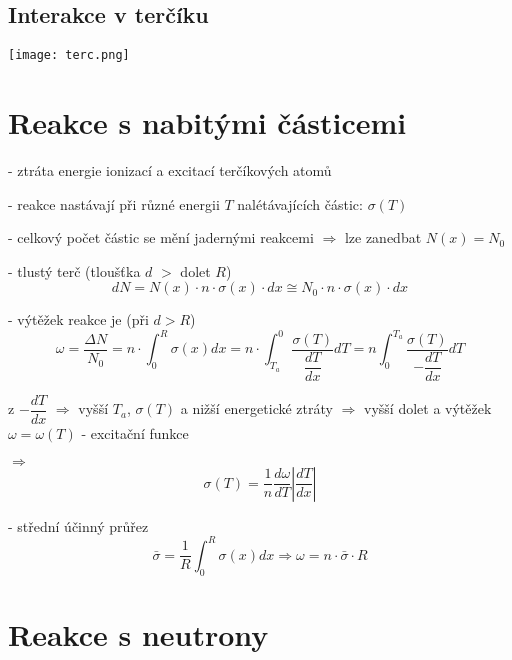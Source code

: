 \documentclass[../../main.tex]{subfiles}
\begin{document}
\subsection{Interakce v terčíku}

\begin{center}
	\texttt{[image: terc.png]}
\end{center}
	
\section{Reakce s nabitými částicemi}

- ztráta energie ionizací a excitací terčíkových atomů

- reakce nastávají při různé energii $T$ nalétávajících částic: $\sigma(T)$

- celkový počet částic se mění jadernými reakcemi $\Rightarrow$ lze zanedbat $N(x) = N_0$

- tlustý terč (tloušťka $d$ $>$ dolet $R$)
\begin{equation}
dN = N(x) \cdotp n \cdotp \sigma(x) \cdotp dx \cong N_0 \cdotp n \cdotp \sigma(x) \cdotp dx
\end{equation}

- výtěžek reakce je (při $d > R$)
\begin{equation}
\omega = \dfrac{\Delta N}{N_0 } = n \cdotp \int_{0}^{R} \sigma(x) dx = n \cdotp \int_{T_a}^{0} \dfrac{\sigma(T)}{\dfrac{dT}{dx}} dT = n \int_{0}^{T_a} \dfrac{\sigma(T)}{- \dfrac{dT}{dx}} dT
\end{equation}

z $-\dfrac{dT}{dx}$ $\Rightarrow$ vyšší $T_a$, $\sigma(T)$ a nižší energetické ztráty $\Rightarrow$ vyšší dolet a výtěžek $\omega = \omega (T)$ - excitační funkce

$\Rightarrow$ 
\begin{equation}
\sigma(T) = \dfrac{1}{n} \dfrac{d \omega}{dT} \left| \dfrac{dT}{dx} \right| 
\end{equation}

- střední účinný průřez 
\begin{equation}
\bar{\sigma} = \dfrac{1}{R} \int_{0}^{R} \sigma(x) dx \Rightarrow \omega = n \cdotp \bar{\sigma } \cdotp R
\end{equation}

\section{Reakce s neutrony}
\end{document}
